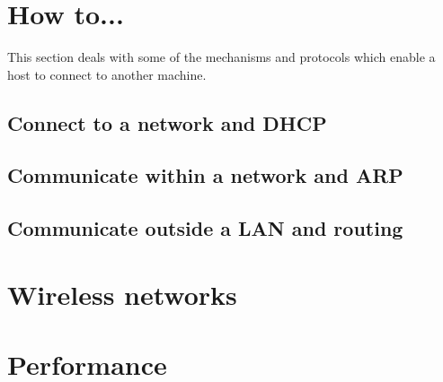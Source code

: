 \section{How to...}
This section deals with some of the mechanisms and protocols which
enable a host to connect to another machine.

\subsection{Connect to a network and DHCP}

\subsection{Communicate within a network and ARP}

\subsection{Communicate outside a LAN and routing}


\section{Wireless networks}
\section{Performance}